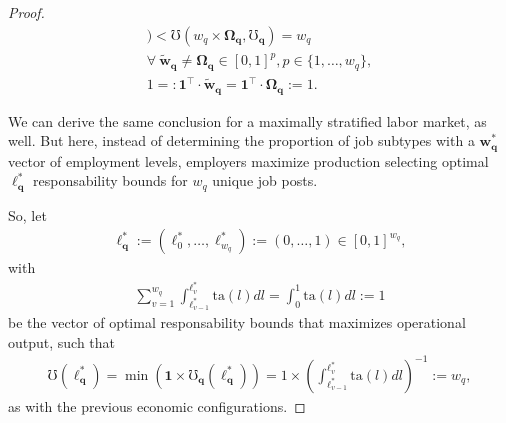 \documentclass[hidelinks, nonatbib]{elsarticle}
\begin{document}
\begin{lemma}
\begin{proof}
\begin{gather}
            )
            < 
            \mho(
                w_{q}
                \times
                \boldsymbol{\Omega_{q}},
                \boldsymbol{\mho_q}
            ) 
            = w_q
            \\
            \forall
            \
            \boldsymbol{\tilde{w}_{q}}
            \neq
            \boldsymbol{\Omega_{q}}
            \in
            [0,1]^{p}
            ,
            p \in \{1, \dots, w_q\}
            ,
            \\
            1 =:
            \boldsymbol{1} ^ {\top}
            \cdot
            \boldsymbol{\tilde{w}_{q}}
            =
            \boldsymbol{1} ^ {\top}
            \cdot
            \boldsymbol{\Omega_{q}}
            := 1
            .
        \end{gather}
        
        We can derive the same conclusion for a maximally stratified labor market, as well. But here, instead of determining the proportion of job subtypes with a $\boldsymbol{w_{q}^{*}}$ vector of employment levels, employers maximize production selecting optimal $\boldsymbol{\ell_{q}^{*}}$ responsability bounds for $w_q$ unique job posts.
        
        So, let 
        \begin{gather}
            \boldsymbol{\ell_{q}^{*}}
            :=
            (\ell_{0}^{*}, \dots, \ell_{w_q}^{*})
            :=
            (0, \dots, 1) 
            \in [0,1]^{w_q}
            ,
        \end{gather}
        with
        \begin{gather}
        \sum_{v=1}^{w_q}
        \int_{
            \ell_{v-1}^{*}
        }^{
            \ell_{v}^{*}
        }
        \text{ta}(l)dl
        =
        \int_{0}^{1}
        \text{ta}(l)dl
        :=
        1
        \end{gather}
        be the vector of optimal responsability bounds that maximizes operational output, such that
        \begin{gather}
            \mho(\boldsymbol{\ell_{q}^{*}})
            =
            \min(
                \boldsymbol{1}
                \times
                \boldsymbol{\mho_q}(
                    \boldsymbol{\ell_{q}^{*}}
                )
            )
            =
            1
            \times
            \left(
                \int_{
                    \ell_{v-1}^{*}
                }^{
                    \ell_{v}^{*}
                }
                \text{ta}(l)dl
            \right) ^ {-1}
            :=
            w_q
            ,
        \end{gather}
        as with the previous economic configurations.
        

\end{proof}
\end{lemma}
\end{document}
